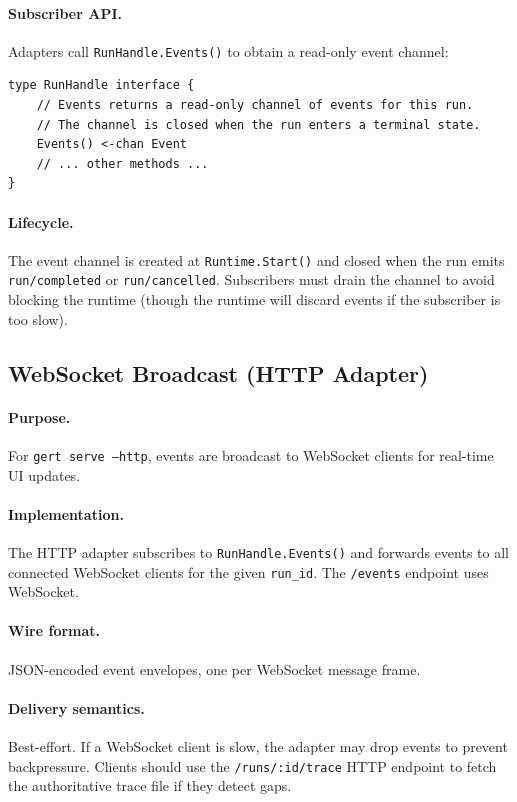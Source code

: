 \paragraph{Subscriber API.} Adapters call \texttt{RunHandle.Events()} to obtain a read-only event channel:

\begin{verbatim}
type RunHandle interface {
    // Events returns a read-only channel of events for this run.
    // The channel is closed when the run enters a terminal state.
    Events() <-chan Event
    // ... other methods ...
}
\end{verbatim}

\paragraph{Lifecycle.} The event channel is created at \texttt{Runtime.Start()} and closed when the run emits \texttt{run/completed} or \texttt{run/cancelled}. Subscribers must drain the channel to avoid blocking the runtime (though the runtime will discard events if the subscriber is too slow).


\subsection{WebSocket Broadcast (HTTP Adapter)}

\paragraph{Purpose.} For \texttt{gert serve --http}, events are broadcast to WebSocket clients for real-time UI updates.

\paragraph{Implementation.} The HTTP adapter subscribes to \texttt{RunHandle.Events()} and forwards events to all connected WebSocket clients for the given \texttt{run\_id}. The \texttt{/events} endpoint uses WebSocket.

\paragraph{Wire format.} JSON-encoded event envelopes, one per WebSocket message frame.

\paragraph{Delivery semantics.} Best-effort. If a WebSocket client is slow, the adapter may drop events to prevent backpressure. Clients should use the \texttt{/runs/:id/trace} HTTP endpoint to fetch the authoritative trace file if they detect gaps.

